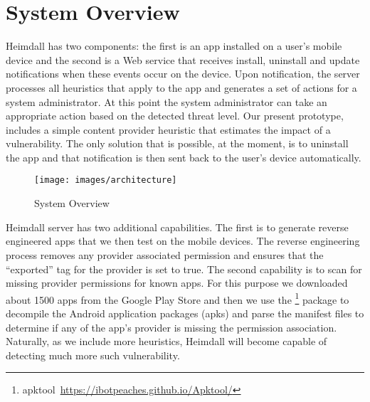 \section{System Overview}
\label{overview}
\noindent
Heimdall has two components: the first is an app installed on a user's mobile device and the second is a Web service that receives install, uninstall and update notifications when these events occur on the device. Upon notification, the server processes all heuristics that apply to the app and generates a set of actions for a system administrator. At this point the system administrator can take an appropriate action based on the detected threat level. Our present prototype, includes a simple content provider heuristic that estimates the impact of a vulnerability. The only solution that is possible, at the moment, is to uninstall the app and that notification is then sent back to the user's device automatically.

\begin{figure}[tb]
	\centering
	\texttt{[image: images/architecture]}
	\caption{System Overview}
	\label{fig:arch}
\end{figure}

Heimdall server has two additional capabilities. The first is to generate reverse engineered apps that we then test on the mobile devices. The reverse engineering process removes any provider associated permission and ensures that the ``exported'' tag for the provider is set to true. The second capability is to scan for missing provider permissions for known apps. For this purpose we downloaded about 1500 apps from the Google Play Store and then we use the \footnote{apktool~\url{https://ibotpeaches.github.io/Apktool/}} package to decompile the Android application packages (apks) and parse the manifest files to determine if any of the app's provider is missing the permission association. Naturally, as we include more heuristics, Heimdall will become capable of detecting much more such vulnerability.


